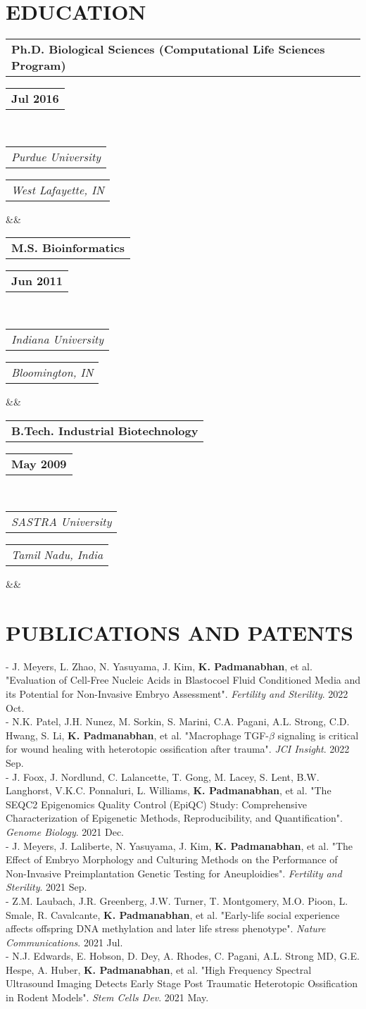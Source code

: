 \documentclass[11pt,letterpaper,sans]{moderncv}        %
\makeatletter
\newcommand*{\customcventry}[7][.25em]{
  \begin{tabular}{@{}l} 
    {\bfseries #4}
  \end{tabular}
  \hfill%
  \begin{tabular}{l@{}}
     {\bfseries #5}
  \end{tabular} \\
  \begin{tabular}{@{}l} 
    {\itshape #3}
  \end{tabular}
  \hfill%
  \begin{tabular}{l@{}}
     {\itshape #2}
  \end{tabular}
  \ifx&#7&%
  \else{\\%
    \begin{minipage}{\maincolumnwidth}%
      \small#7%
    \end{minipage}}\fi%
  \par\addvspace{#1}}
\makeatother
\begin{document}
{\section{EDUCATION}
{\customcventry{West Lafayette, IN}{Purdue University}{Ph.D. Biological Sciences (Computational Life Sciences Program)}{Jul 2016}{}{}}
{\customcventry{Bloomington, IN}{Indiana University}{M.S. Bioinformatics}{Jun 2011}{}{}}
{\customcventry{Tamil Nadu, India}{SASTRA University}{B.Tech. Industrial Biotechnology}{May 2009}{}{}}

\section{PUBLICATIONS AND PATENTS}
\begin{minipage}{\maincolumnwidth}%
	\small{
	- J. Meyers, L. Zhao, N. Yasuyama, J. Kim, \textbf{K. Padmanabhan}, et al. "Evaluation of Cell-Free Nucleic Acids in Blastocoel Fluid Conditioned Media and its Potential for Non-Invasive Embryo Assessment". \textit{Fertility and Sterility}. 2022 Oct.\\
	- N.K. Patel, J.H. Nunez, M. Sorkin, S. Marini, C.A. Pagani, A.L. Strong, C.D. Hwang, S. Li, \textbf{K. Padmanabhan}, et al. "Macrophage TGF-$\beta$ signaling is critical for wound healing with heterotopic ossification after trauma".  \textit{JCI Insight}. 2022 Sep.\\
	- J. Foox, J. Nordlund, C. Lalancette, T. Gong, M. Lacey, S. Lent, B.W. Langhorst, V.K.C. Ponnaluri, L. Williams, \textbf{K. Padmanabhan}, et al. "The SEQC2 Epigenomics Quality Control (EpiQC) Study: Comprehensive Characterization of Epigenetic Methods, Reproducibility, and Quantification".  \textit{Genome Biology}. 2021 Dec.\\
	- J. Meyers, J. Laliberte, N. Yasuyama, J. Kim, \textbf{K. Padmanabhan}, et al. "The Effect of Embryo Morphology and Culturing Methods on the Performance of Non-Invasive Preimplantation Genetic Testing for Aneuploidies". \textit{Fertility and Sterility}. 2021 Sep.\\
	- Z.M. Laubach, J.R. Greenberg, J.W. Turner, T. Montgomery, M.O. Pioon, L. Smale, R. Cavalcante, \textbf{K. Padmanabhan}, et al. "Early-life social experience affects offspring DNA methylation and later life stress phenotype". \textit{Nature Communications}. 2021 Jul.\\
	- N.J. Edwards, E. Hobson, D. Dey, A. Rhodes, C. Pagani, A.L. Strong MD, G.E. Hespe, A. Huber, \textbf{K. Padmanabhan}, et al. "High Frequency Spectral Ultrasound Imaging Detects Early Stage Post Traumatic Heterotopic Ossification in Rodent Models". \textit{Stem Cells Dev}. 2021 May.\\
}
\end{minipage}}
\end{document}

